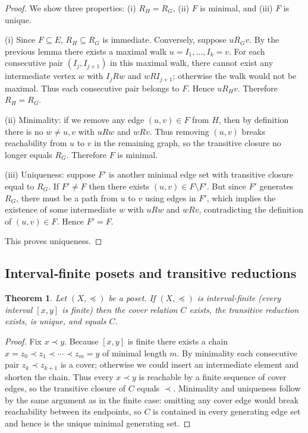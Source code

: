 \documentclass[11pt]{article}
\newtheorem{theorem}[definition]{Theorem}
\begin{document}
\begin{proof}
We show three properties: (i) $R_H=R_G$, (ii) $F$ is minimal, and (iii)
$F$ is unique.

(i) Since $F\subseteq E$, $R_H\subseteq R_G$ is immediate. Conversely,
suppose $uR_G v$. By the previous lemma there exists a maximal walk
$u=I_1,\dots,I_k=v$. For each consecutive pair $(I_j,I_{j+1})$ in this
maximal walk, there cannot exist any intermediate vertex $w$ with
$I_jR w$ and $wR I_{j+1}$; otherwise the walk would not be maximal. Thus
each consecutive pair belongs to $F$. Hence $uR_H v$. Therefore $R_H=R_G$.

(ii) Minimality: if we remove any edge $(u,v)\in F$ from $H$, then by
definition there is no $w\neq u,v$ with $uR w$ and $wR v$. Thus removing
$(u,v)$ breaks reachability from $u$ to $v$ in the remaining graph, so
the transitive closure no longer equals $R_G$. Therefore $F$ is minimal.

(iii) Uniqueness: suppose $F'$ is another minimal edge set with transitive
closure equal to $R_G$. If $F'\neq F$ then there exists $(u,v)\in F\setminus F'$.
But since $F'$ generates $R_G$, there must be a path from $u$ to $v$ using
edges in $F'$, which implies the existence of some intermediate $w$ with
$uR w$ and $wR v$, contradicting the definition of $(u,v)\in F$. Hence
$F'=F$.

This proves uniqueness.
\end{proof}

\subsection*{Interval‑finite posets and transitive reductions}
\begin{theorem}
Let $(X,\preceq)$ be a poset. If $(X,\preceq)$ is interval‑finite (every
interval $[x,y]$ is finite) then the cover relation $C$ exists, the
transitive reduction exists, is unique, and equals $C$.
\end{theorem}

\begin{proof}
Fix $x\prec y$. Because $[x,y]$ is finite there exists a chain
$x=z_0\prec z_1\prec\cdots\prec z_m=y$ of minimal length $m$. By
minimality each consecutive pair $z_k\prec z_{k+1}$ is a cover; otherwise
we could insert an intermediate element and shorten the chain. Thus every
$x\prec y$ is reachable by a finite sequence of cover edges, so the
transitive closure of $C$ equals $\prec$. Minimality and uniqueness
follow by the same argument as in the finite case: omitting any cover edge
would break reachability between its endpoints, so $C$ is contained in
every generating edge set and hence is the unique minimal generating set.
\end{proof}
\end{document}

